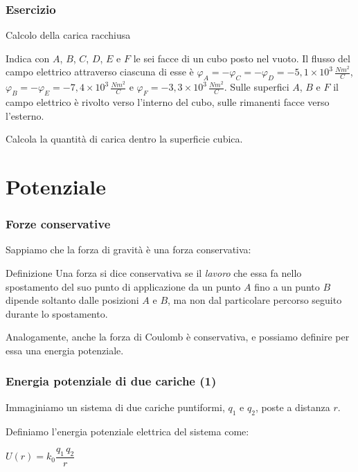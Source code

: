 \documentclass[handout]{beamer}
\theoremstyle{plain}
\begin{document}
\begin{frame}
\frametitle{Esercizio}

\begin{exampleblock}{Calcolo della carica racchiusa}
{\small Indica con $A$, $B$, $C$, $D$, $E$ e $F$ le sei facce di un cubo posto nel vuoto. Il flusso del campo elettrico attraverso ciascuna di esse è $\varphi_A = - \varphi_C = -\varphi_D = - 5,1 \times 10^3 \, \frac{Nm^2}{C}$, $\varphi_B = - \varphi_E = - 7,4 \times 10^3 \, \frac{Nm^2}{C}$ e $\varphi_F = - 3,3 \times 10^3 \, \frac{Nm^2}{C}$. Sulle superfici $A$, $B$ e $F$ il campo elettrico è rivolto verso l'interno del cubo, sulle rimanenti facce verso l'esterno.

Calcola la quantità di carica dentro la superficie cubica.}
\end{exampleblock}
\end{frame}





\section{Potenziale}

\begin{frame}
\frametitle{Forze conservative}
Sappiamo che la forza di gravità è una forza conservativa:
\begin{block}{Definizione}
Una forza si dice conservativa se il \emph{lavoro} che essa fa nello spostamento del suo punto di applicazione da un punto $ A $ fino a un punto $ B $ dipende soltanto dalle posizioni $ A $ e $ B $, ma non dal particolare percorso seguito durante lo spostamento.
\end{block}\pause
Analogamente, anche la forza di Coulomb è conservativa, e possiamo definire per essa una \alert{energia potenziale}.
\end{frame}


\begin{frame}
\frametitle{Energia potenziale di due cariche (1)}
Immaginiamo un sistema di due cariche puntiformi, $ q_1 $ e $ q_2 $, poste a distanza $ r $.
\begin{figure}
\end{figure}\pause
Definiamo l'energia potenziale elettrica del sistema come:
\begin{center}
\colorbox{blue!30}{$ U(r) = k_0 \dfrac{q_1 \, q_2}{r} $}
\end{center}
\end{frame}
\end{document}
